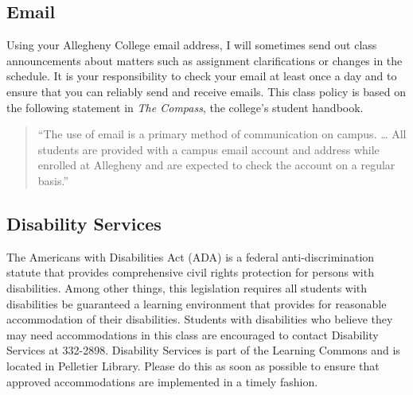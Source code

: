 % 

\vspace*{-.2in}
\subsection*{Email}

Using your Allegheny College email address, I will sometimes send out class announcements about matters such as
assignment clarifications or changes in the schedule. It is your responsibility to check your email at least once a day
and to ensure that you can reliably send and receive emails. This class policy is based on the following statement in
{\em The Compass}, the college's student handbook.

\vspace*{-.1in}
\begin{quote}
``The use of email is a primary method of communication on campus. \ldots
All students are provided with a campus email account and address while
enrolled at Allegheny and are expected to check the account on a regular
basis.'' 
\end{quote}
\vspace*{-.3in}

\subsection*{Disability Services}

The Americans with Disabilities Act (ADA) is a federal anti-discrimination statute that provides comprehensive civil
rights protection for persons with disabilities.  Among other things, this legislation requires all students with
disabilities be guaranteed a learning environment that provides for reasonable accommodation of their disabilities.
Students with disabilities who believe they may need accommodations in this class are encouraged to contact Disability
Services at 332-2898.  Disability Services is part of the Learning Commons and is located in Pelletier Library.
Please do this as soon as possible to ensure that approved accommodations are implemented in a timely fashion.

